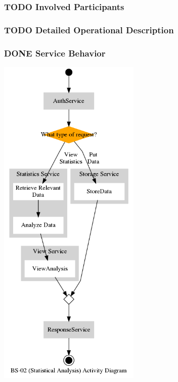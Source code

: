\documentclass[11pt]{article}
\begin{document}
\subsubsection{{\bfseries\sffamily TODO} Involved Participants}
\label{sec:org8851efc}
\subsubsection{{\bfseries\sffamily TODO} Detailed Operational Description}
\label{sec:org1ba3a3f}
\subsubsection{{\bfseries\sffamily DONE} Service Behavior}
\label{sec:orgaf85cb6}
\begin{center}
\includegraphics[height=16.3cm]{res/bs_02_act.png}
\end{center}
\end{document}
